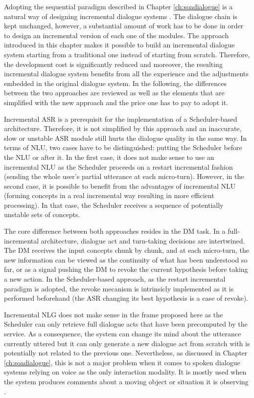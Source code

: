              Adopting the sequential paradigm described in Chapter \ref{ch:soadialogue} is a natural way of designing incremental dialogue systems \cite{Schlangen2011}. The dialogue chain is kept unchanged, however, a substantial amount of work has to be done in order to design an incremental version of each one of the modules. The approach introduced in this chapter makes it possible to build an incremental dialogue system starting from a traditional one instead of starting from scratch. Therefore, the development cost is significantly reduced and moreover, the resulting incremental dialogue system benefits from all the experience and the adjustments embedded in the original dialogue system. In the following, the differences between the two approaches are reviewed as well as the elements that are simplified with the new approach and the price one has to pay to adopt it.

             Incremental ASR is a prerequisit for the implementation of a Scheduler-based architecture. Therefore, it is not simplified by this approach and an inaccurate, slow or unstable ASR module still hurts the dialogue quality in the same way. In terms of NLU, two cases have to be distinguished: putting the Scheduler before the NLU or after it. In the first case, it does not make sense to use an incremental NLU as the Scheduler proceeds on a restart incremental fashion (sending the whole user's partial utterance at each micro-turn). However, in the second case, it is possible to benefit from the advantages of incremental NLU (forming concepts in a real incremental way resulting in more efficient processing). In that case, the Scheduler receives a sequence of potentially unstable sets of concepts.

             The core difference between both approaches resides in the DM task. In a full-incremental architecture, dialogue act and turn-taking decisions are intertwined. The DM receives the input concepts chunk by chunk, and at each micro-turn, the new information can be viewed as the continuity of what has been understood so far, or as a signal pushing the DM to revoke the current hypothesis before taking a new action. In the Scheduler-based approach, as the restart incremental paradigm is adopted, the revoke mecanism is intrinsicly implemented as it is performed beforehand (the ASR changing its best hypothesis is a case of revoke).

             Incremental NLG does not make sense in the frame proposed here as the Scheduler can only retrieve full dialogue acts that have been precomputed by the service. As a consequence, the system can change its mind about the utterance currently uttered but it can only generate a new dialogue act from scratch with is potentially not related to the previous one. Nevertheless, as discussed in Chapter \ref{ch:soadialogue}, this is not a major problem when it comes to spoken dialogue systems relying on voice as the only interaction modality. It is mostly used when the system produces comments about a moving object or situation it is observing \cite{Baumann2013}.

